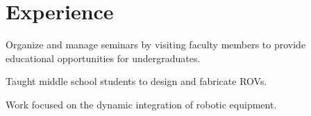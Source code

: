 \documentclass[letterpaper]{deedy-resume} %
\begin{document}
\begin{minipage}[t]{0.58\textwidth} %


\section{Experience}

\vspace{\topsep}
\begin{tightitemize}
\item Organize and manage seminars by visiting faculty members to provide educational opportunities for undergraduates.
\end{tightitemize}

\sectionspace


\begin{tightitemize}
\item Taught middle school students to design and fabricate ROVs.
\end{tightitemize}

\sectionspace %





\begin{tightitemize}
\item Work focused on the dynamic integration of robotic equipment.
\end{tightitemize}





\end{minipage}
\end{document}
